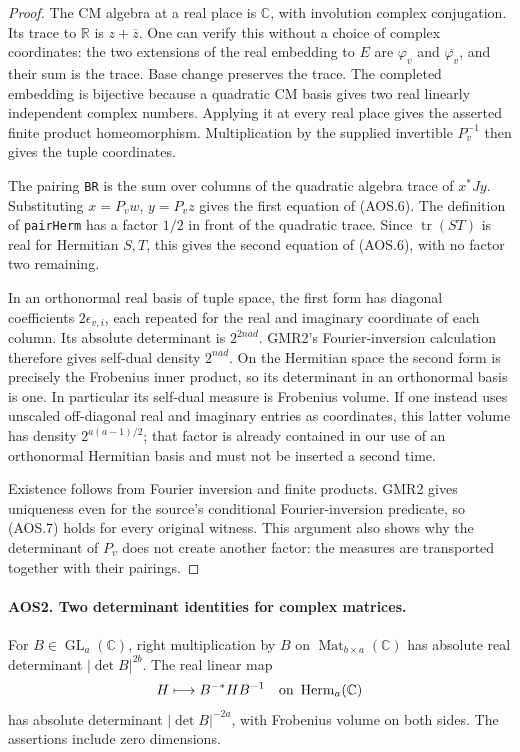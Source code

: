 \begin{proof}
The CM algebra at a real place is $\mathbb C$, with involution complex
conjugation.  Its trace to $\mathbb R$ is $z+\overline z$.
One can verify this without a choice of complex coordinates: the two
extensions of the real embedding to $E$ are $\varphi_v$ and
$\overline{\varphi_v}$, and their sum is the trace.  Base change
preserves the trace.  The completed embedding is bijective because a
quadratic CM basis gives two real linearly independent complex
numbers.  Applying it at every real place gives the asserted finite
product homeomorphism.  Multiplication by the supplied invertible
$P_v^{-1}$ then gives the tuple coordinates.

The pairing \texttt{BR} is the sum over columns of the quadratic
algebra trace of $x^*Jy$.  Substituting $x=P_vw$, $y=P_vz$ gives the
first equation of (AOS.6).  The definition of \texttt{pairHerm} has a
factor $1/2$ in front of the quadratic trace.  Since
$\operatorname{tr}(ST)$ is real for Hermitian $S,T$, this gives the
second equation of (AOS.6), with no factor two remaining.

In an orthonormal real basis of tuple space, the first form has
diagonal coefficients $2\epsilon_{v,i}$, each repeated for the real
and imaginary coordinate of each column.  Its absolute determinant
is $2^{2nad}$.  GMR2's Fourier-inversion calculation therefore gives
self-dual density $2^{nad}$.  On the Hermitian space the second form
is precisely the Frobenius inner product, so its determinant in an
orthonormal basis is one.  In particular its self-dual measure is
Frobenius volume.  If one instead uses unscaled off-diagonal real and
imaginary entries as coordinates, this latter volume has density
$2^{a(a-1)/2}$; that factor is already contained in our use of an
orthonormal Hermitian basis and must not be inserted a second time.

Existence follows from Fourier inversion and finite products.  GMR2
gives uniqueness even for the source's conditional Fourier-inversion
predicate, so (AOS.7) holds for every original witness.  This argument
also shows why the determinant of $P_v$ does not create another
factor: the measures are transported together with their pairings.
\end{proof}

\paragraph{AOS2. Two determinant identities for complex matrices.}
\label{claim:AOS2}
For $B\in\operatorname{GL}_a(\mathbb C)$, right multiplication by $B$
on $\operatorname{Mat}_{b\times a}(\mathbb C)$ has absolute real
determinant $|\det B|^{2b}$.  The real linear map
\[
       H\longmapsto B^{-*}HB^{-1}
       \quad\hbox{on }\operatorname{Herm}_a(\mathbb C)
\]
has absolute determinant $|\det B|^{-2a}$, with Frobenius volume on
both sides.  The assertions include zero dimensions.

